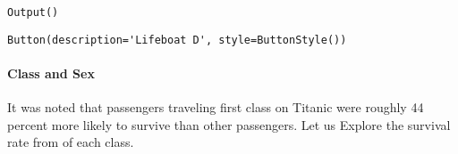 \documentclass[11pt]{article}
\begin{document}
    
    \begin{verbatim}
Output()
    \end{verbatim}

    
    
    \begin{verbatim}
Button(description='Lifeboat D', style=ButtonStyle())
    \end{verbatim}

    
    \paragraph{Class and Sex}\label{class-and-sex}

It was noted that passengers traveling first class on Titanic were
roughly 44 percent more likely to survive than other passengers. Let us
Explore the survival rate from of each class.
\end{document}
